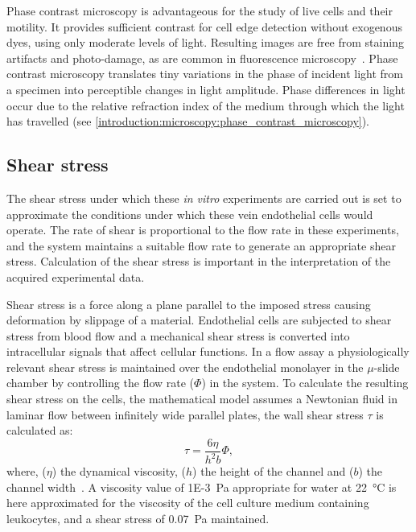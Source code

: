 Phase contrast microscopy is advantageous for the study of live cells and their motility. It provides sufficient contrast for cell edge detection without exogenous dyes, using only moderate levels of light. Resulting images are free from staining artifacts and photo-damage, as are common in fluorescence microscopy~\cite{Ambuhl2012}. Phase contrast microscopy translates tiny variations in the phase of incident light from a specimen into perceptible changes in light amplitude. Phase differences in light occur due to the relative refraction index of the medium through which the light has travelled (see \autoref{introduction:microscopy:phase_contrast_microscopy}).

\subsection{Shear stress}
\label{leukocytes:introduction:shear}
The shear stress under which these \emph{in vitro} experiments are carried out is set to approximate the conditions under which these vein endothelial cells would operate. The rate of shear is proportional to the flow rate in these experiments, and the system maintains a suitable flow rate to generate an appropriate shear stress. Calculation of the shear stress is important in the interpretation of the acquired experimental data.

Shear stress is a force along a plane parallel to the imposed stress causing deformation by slippage of a material. Endothelial cells are subjected to shear stress from blood flow and a mechanical shear stress is converted into intracellular signals that affect cellular functions. In a flow assay a physiologically relevant shear stress is maintained over the endothelial monolayer in the $\mu$-slide chamber by controlling the flow rate ($\Phi$) in the system. To calculate the resulting shear stress on the cells, the mathematical model assumes a Newtonian fluid in laminar flow between infinitely wide parallel plates, the wall shear stress $\tau$ is calculated as:
\begin{equation}
	\tau=\frac{6\eta}{h^2b}\Phi,
\end{equation}
where, ($\eta$) the dynamical viscosity, ($h$) the height of the channel and ($b$) the channel width~\cite{Bacabac2005}. A viscosity value of \SI{1E-3}{Pa} appropriate for water at \SI{22}{\degreeCelsius} is here approximated for the viscosity of the cell culture medium containing leukocytes, and a shear stress of \SI{0.07}{\pascal} maintained.

